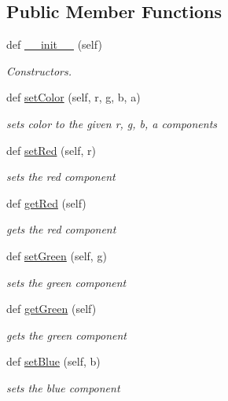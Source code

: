 \subsection*{Public Member Functions}
\begin{DoxyCompactItemize}
\item 
def \hyperlink{class_color_1_1_color_a54e49ab0562f1754ee309481f889734b}{\+\_\+\+\_\+init\+\_\+\+\_\+} (self)
\begin{DoxyCompactList}\small\item\em Constructors. \end{DoxyCompactList}\item 
def \hyperlink{class_color_1_1_color_afa03ead21a88146b5ddbc89a53ffcda8}{set\+Color} (self, r, g, b, a)
\begin{DoxyCompactList}\small\item\em sets color to the given r, g, b, a components \end{DoxyCompactList}\item 
def \hyperlink{class_color_1_1_color_ac9000b54846a4d69171dd81172e53f96}{set\+Red} (self, r)
\begin{DoxyCompactList}\small\item\em sets the red component \end{DoxyCompactList}\item 
def \hyperlink{class_color_1_1_color_af714dcb6373051df8548d41ea4160896}{get\+Red} (self)
\begin{DoxyCompactList}\small\item\em gets the red component \end{DoxyCompactList}\item 
def \hyperlink{class_color_1_1_color_a3ea676f0ace46e02292527acc7915d0b}{set\+Green} (self, g)
\begin{DoxyCompactList}\small\item\em sets the green component \end{DoxyCompactList}\item 
def \hyperlink{class_color_1_1_color_acf5013ef6e09f0d3a86b6f4044e60abb}{get\+Green} (self)
\begin{DoxyCompactList}\small\item\em gets the green component \end{DoxyCompactList}\item 
def \hyperlink{class_color_1_1_color_a2fad4bb66a79ba2b51acfa875f376c3b}{set\+Blue} (self, b)
\begin{DoxyCompactList}\small\item\em sets the blue component \end{DoxyCompactList}\item 

\end{DoxyCompactItemize}
